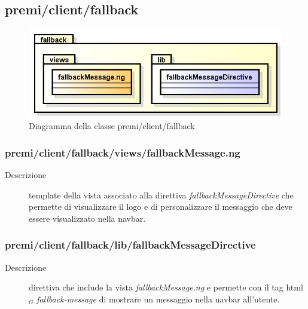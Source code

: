 \subsection{premi/client/fallback}
\begin{figure}[H]
\begin{center}
\includegraphics[scale=0.70]{img/diapkg/fallback.png}
\caption{Diagramma della classe premi/client/fallback}
\end{center}
\end{figure}

\subsubsection{premi/client/fallback/views/fallbackMessage.ng}

\begin{description}
\item[Descrizione] \hfill
	template della vista associato alla direttiva \textit{fallbackMessageDirective} che permette di visualizzare il logo e di personalizzare il messaggio che deve essere visualizzato nella navbar.
\end{description}

\subsubsection{premi/client/fallback/lib/fallbackMessageDirective}

\begin{description}
\item[Descrizione] \hfill
	direttiva che include la vista \textit{fallbackMessage.ng} e permette con il tag html$_G$ \textit{fallback-message} di mostrare un messaggio nella navbar all'utente.
\end{description}

